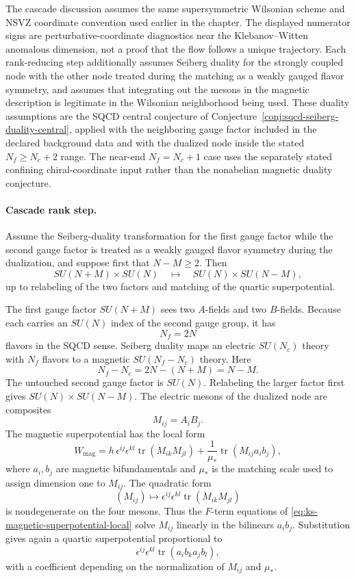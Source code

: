 \begin{hypothesis}
\label{hyp:ks-cascade-input-assumptions}
The cascade discussion assumes the same supersymmetric Wilsonian scheme and
NSVZ coordinate convention used earlier in the chapter.  The displayed
numerator signs are perturbative-coordinate diagnostics near the
Klebanov--Witten anomalous dimension, not a proof that the flow follows a
unique trajectory.  Each rank-reducing step additionally assumes Seiberg
duality for the strongly coupled node with the other node treated during the
matching as a weakly gauged flavor symmetry, and assumes that integrating out
the mesons in the magnetic description is legitimate in the Wilsonian
neighborhood being used.  These duality assumptions are the SQCD central
conjecture of Conjecture~\ref{conj:sqcd-seiberg-duality-central}, applied
with the neighboring gauge factor included in the declared background data and
with the dualized node inside the stated \(N_f\ge N_c+2\) range.  The
near-end \(N_f=N_c+1\) case uses the separately stated confining
chiral-coordinate input rather than the nonabelian magnetic duality
conjecture.
\end{hypothesis}

\paragraph{Cascade rank step.}
Assume the Seiberg-duality transformation for the first gauge factor while
the second gauge factor is treated as a weakly gauged flavor symmetry during
the dualization, and suppose first that \(N-M\ge2\).  Then
\[
  SU(N+M)\times SU(N)
  \quad\longmapsto\quad
  SU(N)\times SU(N-M),
\]
up to relabeling of the two factors and matching of the quartic
superpotential.

The first gauge factor \(SU(N+M)\) sees two \(A\)-fields and two \(B\)-fields.
Because each carries an \(SU(N)\) index of the second gauge group, it has
\[
  N_f=2N
\]
flavors in the SQCD sense.  Seiberg duality maps an electric
\(SU(N_c)\) theory with \(N_f\) flavors to a magnetic
\(SU(N_f-N_c)\) theory.  Here
\[
  N_f-N_c=2N-(N+M)=N-M .
\]
The untouched second gauge factor is \(SU(N)\).  Relabeling the larger
factor first gives \(SU(N)\times SU(N-M)\).  The electric mesons of the
dualized node are composites
\[
  M_{ij}=A_iB_j .
\]
The magnetic superpotential has the local form
\begin{equation}
  W_{\mathrm{mag}}
  =
  h\,\epsilon^{ij}\epsilon^{kl}\operatorname{tr}(M_{ik}M_{jl})
  +
  \frac1{\mu_*}\operatorname{tr}(M_{ij}a_i b_j),
  \label{eq:ks-magnetic-superpotential-local}
\end{equation}
where \(a_i,b_j\) are magnetic bifundamentals and \(\mu_*\) is the matching
scale used to assign dimension one to \(M_{ij}\).  The quadratic form
\[
  (M_{ij})\longmapsto
  \epsilon^{ij}\epsilon^{kl}\operatorname{tr}(M_{ik}M_{jl})
\]
is nondegenerate on the four mesons.  Thus the \(F\)-term equations of
\eqref{eq:ks-magnetic-superpotential-local} solve \(M_{ij}\) linearly in
the bilinears \(a_i b_j\).  Substitution gives again a quartic
superpotential proportional to
\[
  \epsilon^{ij}\epsilon^{kl}\operatorname{tr}(a_i b_k a_j b_l),
\]
with a coefficient depending on the normalization of \(M_{ij}\) and
\(\mu_*\).

